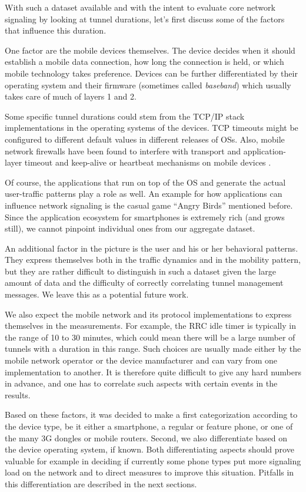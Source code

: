 With such a dataset available and with the intent to evaluate core network signaling by looking at tunnel durations, let's first discuss some of the factors that influence this duration.

One factor are the mobile devices themselves. The device decides when it should establish a mobile data connection, how long the connection is held, or which mobile technology takes preference. Devices can be further differentiated by their operating system and their firmware (sometimes called \textit{baseband}) which usually takes care of much of layers 1 and 2.

Some specific tunnel durations could stem from the TCP/IP stack implementations in the operating systems of the devices. TCP timeouts might be configured to different default values in different releases of OSs. Also, mobile network firewalls have been found to interfere with transport and application-layer timeout and keep-alive or heartbeat mechanisms on mobile devices \cite{sigcomm11middleboxes}.

Of course, the applications that run on top of the OS and generate the actual user-traffic patterns play a role as well. An example for how applications can influence network signaling is the casual game ``Angry Birds'' mentioned before. Since the application ecosystem for smartphones is extremely rich (and grows still), we cannot pinpoint individual ones from our aggregate dataset.

An additional factor in the picture is the user and his or her behavioral patterns. They express themselves both in the traffic dynamics and in the mobility pattern, but they are rather difficult to distinguish in such a dataset given the large amount of data and the difficulty of correctly correlating tunnel management messages. We leave this as a potential future work.

We also expect the mobile network and its protocol implementations to express themselves in the measurements. For example, the \ac{RRC} idle timer is typically in the range of 10 to 30 minutes, which could mean there will be a large number of tunnels with a duration in this range. Such choices are usually made either by the mobile network operator or the device manufacturer and can vary from one implementation to another. It is therefore quite difficult to give any hard numbers in advance, and one has to correlate such aspects with certain events in the results.

Based on these factors, it was decided to make a first categorization according to the device type, be it either a smartphone, a regular or feature phone, or one of the many 3G dongles or mobile routers. Second, we also differentiate based on the device operating system, if known. Both differentiating aspects should prove valuable for example in deciding if currently some phone types put more signaling load on the network and to direct measures to improve this situation. Pitfalls in this differentiation are described in the next sections.



